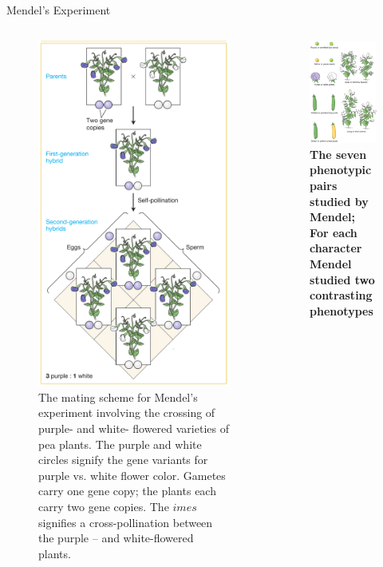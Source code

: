 \documentclass[11pt,ignorenonframetext,aspectratio=169]{beamer}
\begin{document}
\begin{frame}{Mendel's Experiment}
\protect\hypertarget{mendels-experiment}{}
\begin{columns}[T,onlytextwidth]
  

\begin{figure}
\includegraphics[width=0.35\linewidth]{../images/mendels_experiment} \caption{The mating scheme for Mendel’s experiment involving the crossing of purple- and white- flowered varieties of pea plants. The purple and white circles signify the gene variants for purple vs. white flower color. Gametes carry one gene copy; the plants each carry two gene copies. The $  imes$ signifies a cross-pollination between the purple -- and white-flowered plants.}\label{fig:mendels-experiment}
\end{figure}
  

\begin{figure}
\includegraphics[width=0.5\linewidth]{../images/mendels_pea} \caption{\textbf{The seven phenotypic pairs studied by Mendel; For each character Mendel studied two contrasting phenotypes} \newline }\label{fig:mendels-pea}
\end{figure}

\end{columns}
\end{frame}
\end{document}
